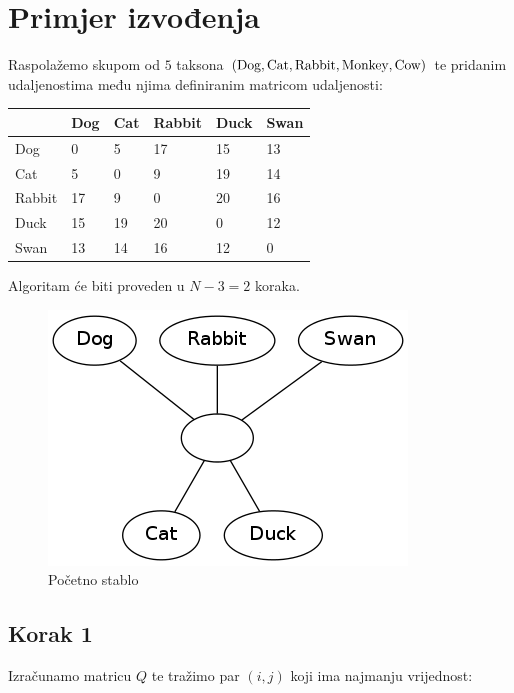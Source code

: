 \documentclass[times, utf8, seminar, numeric]{fer}
\begin{document}
\chapter{Primjer izvođenja}

Raspolažemo skupom od $5$ taksona $(\textup{Dog},\textup{Cat},\textup{Rabbit},\textup{Monkey},\textup{Cow})$ te pridanim udaljenostima među njima definiranim matricom udaljenosti:
\begin{table}[h]
	\centering
    \begin{tabular}{|l|l|l|l|l|l|}
    \hline
    ~ & Dog  & Cat  & Rabbit  & Duck  & Swan  \\ \hline
    Dog & 0  & 5  & 17 & 15 & 13 \\ \hline
    Cat & 5  & 0  & 9  & 19 & 14 \\ \hline
    Rabbit & 17 & 9  & 0  & 20 & 16 \\ \hline
    Duck & 15 & 19 & 20 & 0  & 12 \\ \hline
    Swan & 13 & 14 & 16 & 12 & 0  \\ \hline
    \end{tabular}
\end{table}

Algoritam će biti proveden u $N-3=2$ koraka. \newline

\begin{figure}[htb]
\centering
\includegraphics[scale=0.6]{./img/pocetni.png}
\caption{Početno stablo}
\end{figure}

\newpage
\section{Korak 1}
Izračunamo matricu $Q$ te tražimo par $(i,j)$ koji ima najmanju vrijednost:
\end{document}
